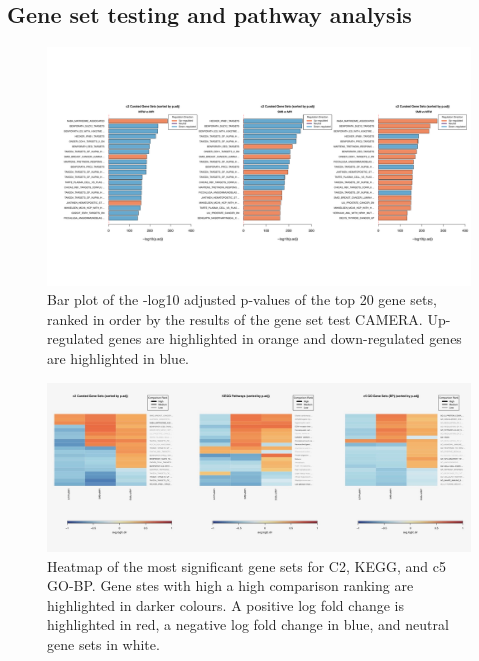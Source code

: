 \documentclass[12pt,a4paper,titlepage,twoside,openright]{book}
\begin{document}
\begin{mainmatter}
{{{\section{Gene set testing and pathway analysis}

\begin{figure}[htb!]
\centering
\includegraphics[width=\textwidth,height=\textheight,keepaspectratio]{Figures/all_c2_barplots.pdf}
\caption{Bar plot of the -log10 adjusted p-values of the top 20 gene sets, ranked in order by the results of the gene set test CAMERA. Up-regulated genes are highlighted in orange and down-regulated genes are highlighted in blue.}
\label{fig:Variance Explained}
\end{figure}

\begin{figure}[htb!]
\centering
\includegraphics[width=\textwidth,height=\textheight,keepaspectratio]{Figures/allHeatmapSummary_GeneSets.jpg}
\caption{Heatmap of the most significant gene sets for C2, KEGG, and c5 GO-BP. Gene stes with high a high comparison ranking are highlighted in darker colours. A positive log fold change is highlighted in red, a negative log fold change in blue, and neutral gene sets in white.}
\label{fig:Variance Explained}
\end{figure}

}}}
\end{mainmatter}
\end{document}
